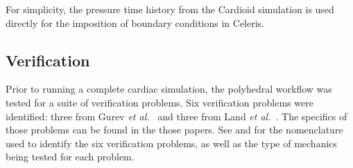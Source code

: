 For simplicity, the pressure time history from the Cardioid simulation is used directly for the imposition of boundary conditions in Celeris.

\subsection{Verification}

Prior to running a complete cardiac simulation, the polyhedral workflow was tested for a suite of verification problems. Six verification problems were identified: three from Gurev \textit{et al.}~\cite{gurev_2015} and three from Land \textit{et al.}~\cite{land_2015}. The specifics of those problems can be found in the those papers. See  and  for the nomenclature used to identify the six verification problems, as well as the type of mechanics being tested for each problem.

